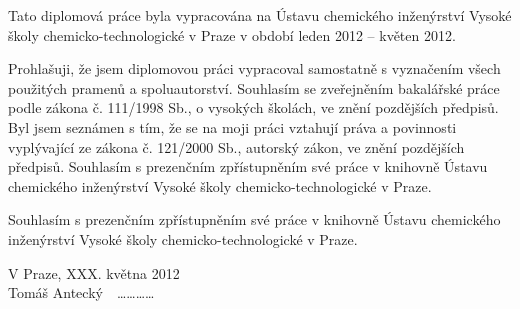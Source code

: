 Tato diplomová práce byla vypracována na Ústavu chemického inženýrství Vysoké školy chemicko-technologické v Praze v období leden 2012 -- květen 2012.


\vspace{16cm}
Prohlašuji, že jsem diplomovou práci vypracoval samostatně s vyznačením všech použitých pramenů a spoluautorství. Souhlasím se zveřejněním bakalářské práce podle zákona č. 111/1998 Sb., o vysokých školách, ve znění pozdějších předpisů. Byl jsem seznámen s tím, že se na moji práci vztahují práva a povinnosti vyplývající ze zákona č. 121/2000 Sb., autorský zákon, ve znění pozdějších předpisů. Souhlasím s prezenčním zpřístupněním své práce v knihovně Ústavu chemického inženýrství Vysoké školy chemicko-technologické v Praze.

Souhlasím s prezenčním zpřístupněním své práce v knihovně Ústavu chemického inženýrství Vysoké školy chemicko-technologické v Praze.

\vspace{1cm}
\noindent
V Praze, XXX. května 2012\\

\hfill Tomáš Antecký \,\, \ldots\ldots\ldots\ldots
